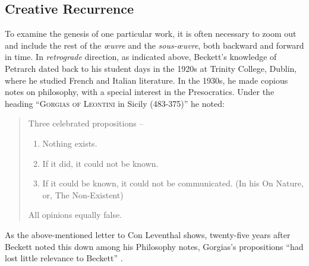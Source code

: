 \begin{paper}
\section{Creative Recurrence}

To examine the genesis of one particular work, it is often necessary to
zoom out and include the rest of the \emph{œuvre} and the
\emph{sous-œuvre}, both backward and forward in time. In
\emph{retrograde} direction, as indicated above, Beckett's knowledge of
Petrarch dated back to his student days in the 1920s at Trinity College,
Dublin, where he studied French and Italian literature. In the 1930s, he
made copious notes on philosophy, with a special interest in the
Presocratics. Under the heading ``\textsc{{Gorgias of Leontini}} in
Sicily (483-375)'' he noted:

\begin{quote}
Three celebrated propositions --

\begin{enumerate}
\def\labelenumi{\arabic{enumi}.}
\item
  Nothing exists.
\item
  If it did, it could not be known.
\item
  If it could be known, it could not be communicated. (In his {On
  Nature, or, The Non-Existent})
\end{enumerate}

All opinions equally false. 
\begin{flushright}
\citep[TCD MS 10967/48; qtd in][76]{feldman_becketts_2009}
\end{flushright}
\end{quote}

\noindent As the above-mentioned letter to Con Leventhal shows, twenty-five years
after Beckett noted this down among his Philosophy notes, Gorgias's
propositions ``had lost little relevance to Beckett'' \citep[76]{feldman_becketts_2009}.


\end{paper}
